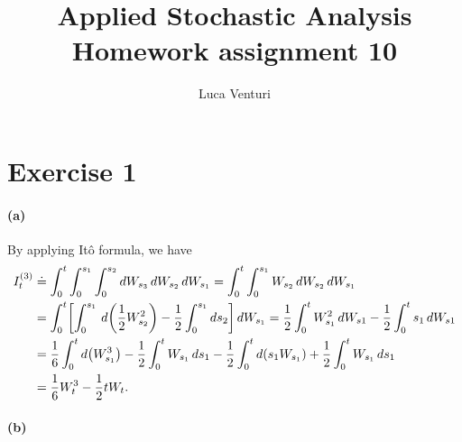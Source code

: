 \documentclass[a4paper,11pt]{article}
\theoremstyle{definition}
\theoremstyle{plain}
\theoremstyle{remark}
\DeclarePairedDelimiter{\parr}{(}{)}
\DeclarePairedDelimiter{\parq}{[}{]}
\begin{document}
\title{Applied Stochastic Analysis \\ Homework assignment 10}
\author{Luca Venturi}
\maketitle

\section*{Exercise 1}

\paragraph*{(a)}

By applying It\^o formula, we have
\begin{align*}
I^{(3)}_t & \doteq \int_0^t\int_0^{s_1}\int_0^{s_2} dW_{s_3}\,dW_{s_2}\,dW_{s_1} = \int_0^t\int_0^{s_1}W_{s_2}\,dW_{s_2}\,dW_{s_1} \\
& = \int_0^t\parq*{\int_0^{s_1}\,d\parr*{\frac{1}{2}W_{s_2}^2} - \frac{1}{2}\int_0^{s_1}ds_2}\,dW_{s_1} = \frac{1}{2}\int_0^t W_{s_1}^2\,dW_{s1} - \frac{1}{2}\int_0^t s_1\,dW_{s1} \\ & = \frac{1}{6}\int_0^td\parr*{W_{s_1}^3} - \frac{1}{2}\int_0^tW_{s_1}\,ds_1 - \frac{1}{2}\int_0^td(s_1W_{s_1}) + \frac{1}{2}\int_0^t W_{s_1}\,ds_1 \\ & = \frac{1}{6}W_t^3 -\frac{1}{2}tW_t .
\end{align*}

\paragraph*{(b)}
\end{document}
